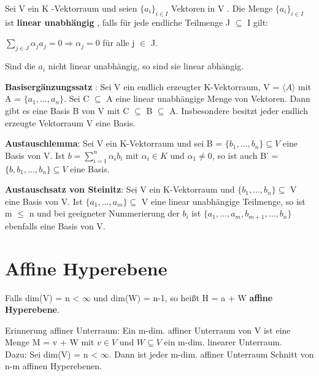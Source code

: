 \begin{definition}
Sei V ein K -Vektorraum und seien $\{a_i \}_{i \in I}$ Vektoren in V . Die Menge $\{a_i\}_{i \in I}$ ist \textbf{linear unabhängig} , falls für jede endliche Teilmenge J $\subseteq$ I gilt:
\begin{center}
$\sum\nolimits_{j \in J} \alpha_j a_j = 0 \Rightarrow \alpha_j = 0$ für alle j $\in$ J.
\end{center}
Sind die $a_i$ nicht linear unabhängig, so sind sie linear abhängig.
\end{definition}

\begin{theorem}
\textbf{Basisergänzungssatz} : Sei V ein endlich erzeugter K-Vektorraum, V = $\langle A \rangle$ mit A = $\{a_1,... ,a_n\}$. Sei C $\subseteq$ A eine linear unabhängige Menge von Vektoren. Dann gibt es eine Basis B von V mit C $\subseteq$ B $\subseteq$ A. Insbesondere besitzt jeder endlich erzeugte Vektorraum V eine Basis.
\end{theorem}

\begin{lemma}
\textbf{Austauschlemma}: Sei V ein K-Vektorraum und sei B = $\{b_1,... ,b_n\} \subseteq V$ eine Basis von V. Ist $b= \sum\nolimits_{i=1}^{n} \alpha_i b_i$ mit $\alpha_i \in K$ und $\alpha_1 \neq 0$, so ist auch B' = $\{ b, b_1, …, b_n \} \subseteq V$ eine Basis.
\end{lemma}

\begin{theorem}
\textbf{Austauschsatz von Steinitz}: Sei V ein K-Vektorraum und $\{b_1,... ,b_n\} \subseteq$ V eine Basis von V. Ist $\{a_1,... ,a_m\} \subseteq$ V eine linear unabhängige Teilmenge, so ist m $\le$ n und bei geeigneter Nummerierung der $b_i$ ist $\{a_1,... ,a_m, b_{m+1},... ,b_n\}$ ebenfalls eine Basis von V.
\end{theorem}

\section{Affine Hyperebene}
\begin{definition}
Falls dim(V) = n < $\infty$ und dim(W) = n-1, so heißt H = a + W \textbf{affine Hyperebene}.
\end{definition}

\begin{remark}
Erinnerung affiner Unterraum: Ein m-dim. affiner Unterraum von V ist eine Menge M = v + W mit  $v \in V$ und $W \subseteq V$ ein m-dim. linearer Unterraum.\\
Dazu: Sei dim(V) = n < $\infty$. Dann ist jeder m-dim. affiner Unterraum Schnitt von n-m affinen Hyperebenen.
\end{remark}

